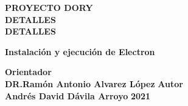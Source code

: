 \begin{titlepage}

\begin{center}
    \large
    {\bf PROYECTO DORY} \\ 
    {\bf DETALLES} \\
    {\bf DETALLES} \\
    
    \par
    \vspace{215pt}
        {\Large \bf Instalación y ejecución de Electron}
    \vspace{7pt}
    
    \par
    \vfill
        {\large  \bf Orientador} \\
        {\large  \bf DR.Ramón Antonio Alvarez López} 
    \vfill
        {\large  \bf Autor} \\
        {\large  \bf Andrés David Dávila Arroyo} 
    \vfill
        \textbf{%
        {\large 2021}}
    \end{center}
\end{titlepage}

